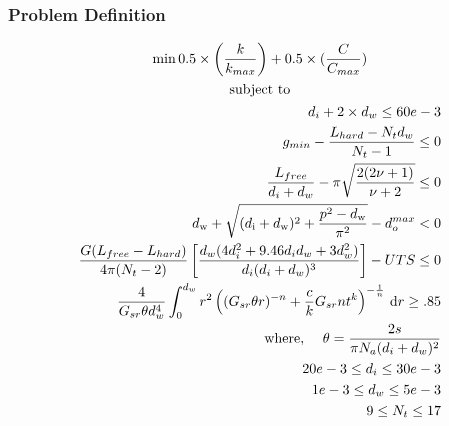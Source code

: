 \documentclass[10pt]{article}
\begin{document}
	\subsubsection{Problem Definition}
	\vspace{-.2in}
	\begin{equation}
					\begin{gathered}
	 					\min_{} 0.5 \times\left(\frac{k}{k_{max}}\right) + 0.5 \times (\frac{C}{C_{max}}) \\
	 					\mbox{subject to} \\%
						\begin{split}
							 d_{i} + 2 \times d_{w} \leq 60e-3\\
							 g_{min} - \dfrac{L_{hard} - N_{t}d_{w}}{N_{t}-1} \leq 0\\
							 \frac{L_{free}}{d_{i} + d_{w}} - \pi \sqrt{\frac{2(2 \nu + 1)}{\nu + 2}} \leq 0\\
							 d_{\text{w}} + \sqrt{(d_{\text{i}} + d_{\text{w}})^{2} + \frac{p^{2} - d_{\text{w}}}{\pi^{2}}} - d_{o}^{max} < 0\\
							 \frac{G(L_{free} - L_{hard})}{4 \pi (N_{t} - 2) } \left[\frac{d_{w} (4d_{i}^{2} + 9.46d_{i} d_{w} + 3 d_{w}^{2})}{d_{i}(d_{i}+d_{w})^{3}}\right] - UTS \leq 0\\
							 \frac{4}{G_{sr}\theta d_w^4}\int_0^{d_w} r^2 \left( (G_{sr}\theta r)^{-n} + \frac{c}{k} G_{sr}nt^k \right)^{-\frac{1}{n}} \,\mathrm{d} r \ge .85\\
							 \mbox{where, } \quad
							  \theta = {2s\over \pi N_a (d_i+d_w)^2}\\
							 20e-3 \leq d_{i} \leq 30e-3\\	 
							 1e-3 \leq d_{w} \leq 5e-3\\	 
							 9 \leq N_{t} \leq 17\\	 
						\end{split}
					\end{gathered}
					\label{eq:Case_2_Problem_Definition}	
				\end{equation}
	
\end{document}
